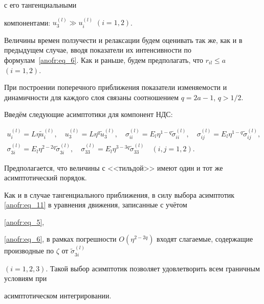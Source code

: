 с его тангенциальными

компонентами: $u_3^{(l)} \gg u_i^{(l)}$ $(i=1, 2)$.



Величины времен ползучести и релаксации будем оценивать так же, как и в предыдущем случае, вводя показатели их интенсивности по формулам~\eqref{anofr:eq_6}. Как и раньше, будем предполагать, что $r_{il} \le a$ $(i=1, 2)$.



При построении поперечного приближения показатели изменяемости и динамичности для каждого слоя связаны соотношением $q=2a-1$, $q>{1}/{2}$.

Введём следующие асимптотики для компонент НДС:

\begin{equation}

\label{anofr:eq_11}

\begin{array}{c}

u_i^{(l)} =L\eta \tilde{u}_i^{(l)},\quad u_3^{(l)} =L\eta ^q \tilde{u}_3^{(l)},\quad

\sigma _{ii}^{(l)} =E_l \eta^{1-q} \tilde{\sigma }_{ii}^{(l)},\quad \sigma _{ij}^{(l)} =E_l \eta^{1-q} \tilde{\sigma }_{ij}^{(l)},\\

\sigma _{3i}^{(l)} =E_l \eta^{2-2q} \tilde{\sigma }_{3i}^{(l)}, \quad \sigma _{33}^{(l)} =E_l \eta^{3-3q} \tilde{\sigma }_{33}^{(l)} \quad

(i,j=1, 2).

\end{array}

\end{equation}

Предполагается, что величины с <<тильдой>> имеют один и тот же асимптотический порядок.



Как и в случае тангенциального приближения, в силу выбора асимптотик \eqref{anofr:eq_11} в уравнения движения, записанные с учётом

\eqref{anofr:eq_5},

\eqref{anofr:eq_6}, в рамках погрешности $O(\eta ^{2-2q} )$ входят слагаемые, содержащие производные по $\zeta $ от $\tilde{\sigma }_{3i}^{(l)}$

$(i={1, 2, 3} )$. Такой выбор асимптотик позволяет удовлетворить всем граничным условиям при

асимптотическом интегрировании.




